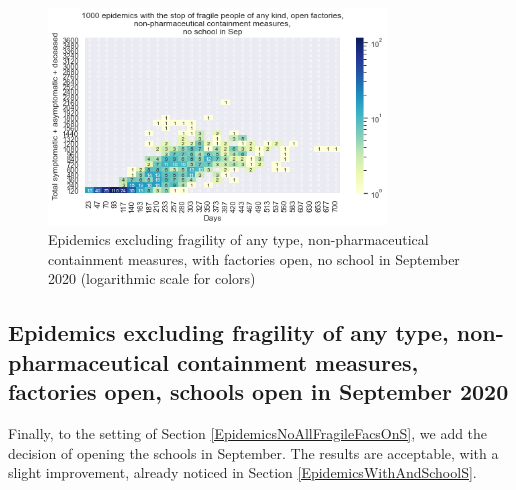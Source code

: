 \documentclass[graybox]{svmult}
\begin{document}
\begin{figure}[h]
\begin{center}
\includegraphics[width=0.8\textwidth]{HM30_readRunResults1k_with_NoAllFrag_openFacs_at20_plusHMlog.png}
\caption{Epidemics excluding fragility of any type, non-pharmaceutical containment measures, with factories open, no school in September 2020 (logarithmic scale for colors)}
\label{EpidemicsNoAllFragileFacsOnHM}
\end{center}
\end{figure}


\subsection{Epidemics excluding fragility of any type, non-pharmaceutical containment measures, factories open, schools open in September 2020}
\label{EpidemicsNoAllFragileFacsOnSchOnS}

Finally, to the setting of Section \ref{EpidemicsNoAllFragileFacsOnS}, we add the decision of opening the schools in September. The results are acceptable, with a slight improvement, already noticed in Section \ref{EpidemicsWithAndSchoolS}.
\end{document}

